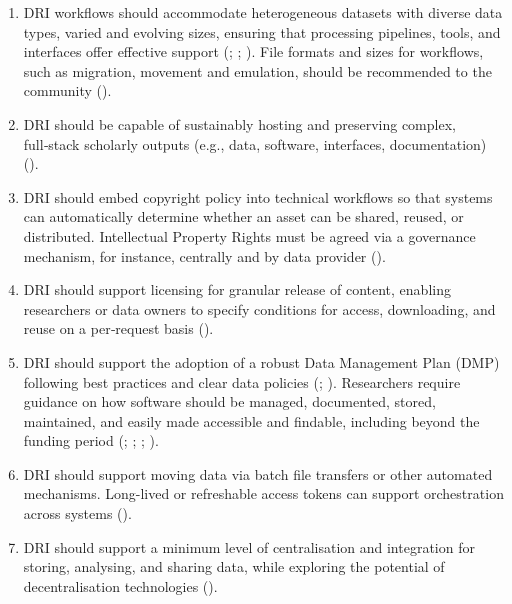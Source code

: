 \documentclass[11pt]{scrartcl}
\begin{document}
\begin{enumerate}[resume]
\item\label{itm:datatypes} DRI workflows should accommodate heterogeneous datasets with diverse data types, varied and evolving sizes, ensuring that processing pipelines, tools, and interfaces offer effective support (\cite{Rodriguez22,de_roure_2022_4716148}; \cite[4]{bell_2025_17099176}; \cite[38]{taylor_2022_10518740}). 
File formats and sizes for workflows, such as migration, movement and emulation, should be recommended to the community 
(\cite[5]{wrro203045}).


\item\label{item:sus} DRI should be capable of sustainably hosting and preserving complex, full‑stack scholarly outputs (e.g., data, software, interfaces, documentation) (\cite[14]{de_roure_2022_4716148}).   

\item\label{itm:ipr} DRI should embed copyright policy into technical workflows so that systems can automatically determine whether an asset can be shared, reused, or distributed. Intellectual Property Rights must be agreed via a governance mechanism, for instance, centrally and by data provider (\cite{de_roure_2022_4716148}).


\item\label{itm:gran} DRI should support licensing for granular release of content, enabling researchers or data owners to specify conditions for access, downloading, and reuse on a per‑request basis (\cite[5]{wrro203045}).

\item DRI should support the adoption of a robust Data Management Plan (DMP) following best practices and clear data policies 
(\cite[50]{taylor_2022_10518740}; \cite[7,9]{hawkins_2024_14006955}).
Researchers require guidance on how software should be managed, documented, stored, maintained, and easily made accessible and findable, including beyond the funding period 
(\cite[40,41]{romanova_2021_5105938}; \cite[40,41]{taylor_2022_10518740}; \cite[63]{shoaib_sufi_2023_7686348}; \cite[1,29]{hawkins_2024_14006955}).   
\item\label{itm:bat} DRI should support moving data via batch file transfers or other automated mechanisms. Long-lived or refreshable access tokens can support orchestration across systems 
(\cite[5]{collier25}).  

\item DRI should support a minimum level of centralisation and integration for storing, analysing, and sharing data, while exploring the potential of decentralisation technologies (\cite[1,12]{hawkins_2024_14006955}).  
\end{enumerate} 
\end{document}
